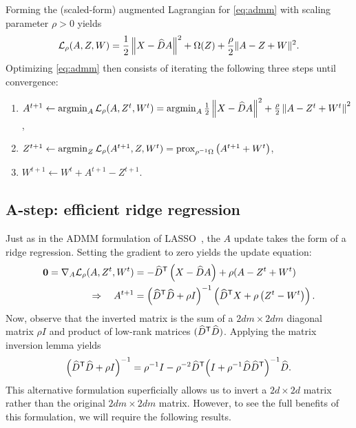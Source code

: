 \documentclass{article} %
\begin{document}
Forming the (scaled-form) augmented Lagrangian for \eqref{eq:admm} with scaling
parameter $\rho > 0 $ yields
\[
\mathcal{L}_\rho(A,Z,W) = \frac{1}{2}\left\|X - \widehat{D}A\right\|^2 + \Omega(Z) +
\frac{\rho}{2}\|A - Z + W\|^2.
\]
Optimizing \eqref{eq:admm} then consists of iterating the following three steps until
convergence:
\begin{enumerate}
\item $A^{t+1} \leftarrow \operatorname*{argmin}_A \mathcal{L}_\rho(A, Z^t, W^t) = \operatorname*{argmin}_A \frac{1}{2}
\left\|X - \widehat{D}A\right\|^2 + \frac{\rho}{2}\left\|A - Z^t + W^t\right\|^2$,
\item $Z^{t+1} \leftarrow \operatorname*{argmin}_Z \mathcal{L}_\rho(A^{t+1}, Z, W^t) =
\operatorname{prox}_{\rho^{-1}\Omega}\left(A^{t+1} + W^t \right)$,
\item $W^{t+1} \leftarrow W^t + A^{t+1} - Z^{t+1}$.
\end{enumerate}

\subsection*{A-step: efficient ridge regression}
Just as in the ADMM formulation of LASSO~\cite[chapter 6]{boyd2011}, the $A$ update takes 
the form of a ridge regression.  Setting the gradient to zero yields the update
equation:
\begin{align}
\mathbf{0} = \nabla_A \mathcal{L}_\rho(A, Z^t, W^t) &= -\widehat{D}^\mathsf{T} \left(X - \widehat{D}A\right)
+ \rho(A - Z^t + W^t)\notag\\
\Rightarrow \quad A^{t+1} &= {\left(\widehat{D}^\mathsf{T} \widehat{D} + \rho I\right)}^{-1}
\left(\widehat{D}^\mathsf{T} X + \rho \left(Z^t - W^t\right)\right).\label{eq:a-update}
\end{align}
Now, observe that the inverted matrix is the sum of a $2dm\times 2dm$ diagonal matrix 
$\rho I$ and product of low-rank matrices $(\widehat{D}^\mathsf{T}\widehat{D})$.  
Applying the matrix inversion lemma yields
\begin{equation}
{\left(\widehat{D}\ensuremath{^\mathsf{T}}\widehat{D} + \rho I\right)}^{-1} = \rho^{-1} I - \rho^{-2} \widehat{D}^\mathsf{T}
{\left(I + \rho^{-1} \widehat{D}\widehat{D}^\mathsf{T} \right)}^{-1}
\widehat{D}.\label{eq:inversion}
\end{equation}
This alternative formulation superficially allows us to invert a $2d\times 2d$
matrix rather than the original $2dm\times 2dm$ matrix.  However, to see the full
benefits of this formulation, we will require the following results.
\end{document}
